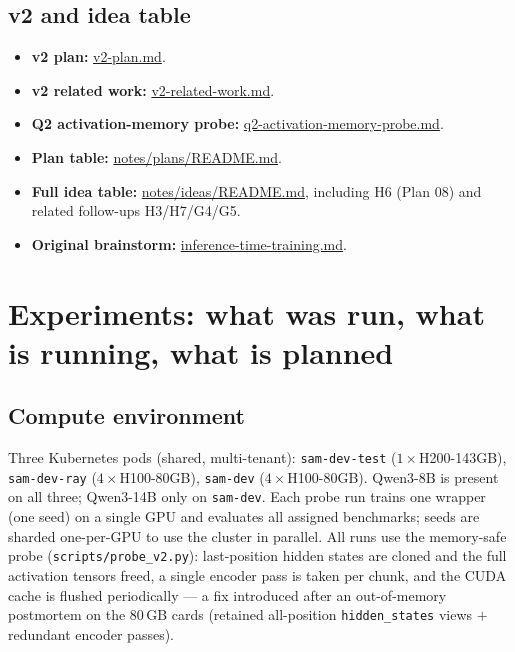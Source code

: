 \documentclass[11pt]{article}
\newcommand{\code}[1]{\texttt{#1}}
\begin{document}
\subsection{v2 and idea table}
\begin{itemize}
\item \textbf{v2 plan:}
\href{https://github.com/BDeMo/research-notes/blob/main/notes/plans/08-model-outputs-delta-w/v2-plan.md}{v2-plan.md}.
\item \textbf{v2 related work:}
\href{https://github.com/BDeMo/research-notes/blob/main/notes/plans/08-model-outputs-delta-w/v2-related-work.md}{v2-related-work.md}.
\item \textbf{Q2 activation-memory probe:}
\href{https://github.com/BDeMo/research-notes/blob/main/notes/plans/08-model-outputs-delta-w/q2-activation-memory-probe.md}{q2-activation-memory-probe.md}.
\item \textbf{Plan table:}
\href{https://github.com/BDeMo/research-notes/blob/main/notes/plans/README.md}{notes/plans/README.md}.
\item \textbf{Full idea table:}
\href{https://github.com/BDeMo/research-notes/blob/main/notes/ideas/README.md}{notes/ideas/README.md},
including H6 (Plan 08) and related follow-ups H3/H7/G4/G5.
\item \textbf{Original brainstorm:}
\href{https://github.com/BDeMo/research-notes/blob/main/notes/ideas/inference-time-training.md}{inference-time-training.md}.
\end{itemize}

\section{Experiments: what was run, what is running, what is planned}
\label{sec:experiments}

\subsection{Compute environment}
Three Kubernetes pods (shared, multi-tenant): \texttt{sam-dev-test}
($1{\times}$H200-143GB), \texttt{sam-dev-ray} ($4{\times}$H100-80GB),
\texttt{sam-dev} ($4{\times}$H100-80GB). Qwen3-8B is present on all
three; Qwen3-14B only on \texttt{sam-dev}. Each probe run trains one
wrapper (one seed) on a single GPU and evaluates all assigned
benchmarks; seeds are sharded one-per-GPU to use the cluster in
parallel. All runs use the memory-safe probe (\code{scripts/probe\_v2.py}):
last-position hidden states are cloned and the full activation tensors
freed, a single encoder pass is taken per chunk, and the CUDA cache is
flushed periodically --- a fix introduced after an out-of-memory
postmortem on the 80\,GB cards (retained all-position
\code{hidden\_states} views $+$ redundant encoder passes).
\end{document}
